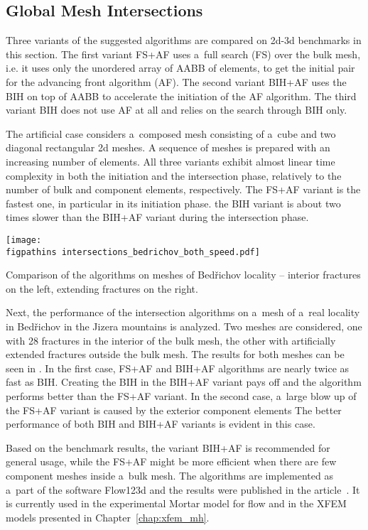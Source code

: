 \subsection{Global Mesh Intersections}
Three variants of the suggested algorithms are compared on 2d-3d benchmarks in this section.
The first variant FS+AF uses a~full search (FS) over the bulk mesh, i.e. it uses only the unordered array of AABB of elements,
to get the initial pair for the advancing front algorithm (AF).
The second variant BIH+AF uses the BIH on top of AABB to accelerate the initiation of the AF algorithm.
The third variant BIH does not use AF at all and relies on the search through BIH only. 

The artificial case considers a~composed mesh consisting of a~cube and two diagonal rectangular 2d meshes.
A sequence of meshes is prepared with an increasing number of elements.
All three variants exhibit almost linear time complexity in both the initiation and the intersection phase,
relatively to the number of bulk and component elements, respectively.
The FS+AF variant is the fastest one, in particular in its initiation phase.
the BIH variant is about two times slower than the BIH+AF variant during the intersection phase. 

\begin{graph}[!htb]
    \centering
    \texttt{[image: \\figpathins intersections\_bedrichov\_both\_speed.pdf]}
    \caption[Comparison of the algorithms on meshes of Bed{\v r}ichov locality.]
    {Comparison of the algorithms on meshes of Bed{\v r}ichov locality -- 
        interior fractures on the left,
        extending fractures on the right.}
    \label{graph:bedrichov_speed}
\end{graph}
%
Next, the performance of the intersection algorithms on a~mesh of a~real locality in Bed{\v r}ichov in the Jizera mountains
is analyzed. Two meshes are considered, one with 28 fractures in the interior of the bulk mesh, 
the other with artificially extended fractures outside the bulk mesh.
The results for both meshes can be seen in .
In the first case, FS+AF and BIH+AF algorithms are nearly twice as fast as BIH.
Creating the BIH in the BIH+AF variant pays off and the algorithm performs better than the FS+AF variant.
In the second case, a~large blow up of the FS+AF variant is caused by the exterior component elements
The better performance of both BIH and BIH+AF variants is evident in this case.


Based on the benchmark results, the variant BIH+AF is recommended for general usage,
while the FS+AF might be more efficient when there are few component meshes inside a~bulk mesh.
The algorithms are implemented as a~part of the software Flow123d and the results were published in the article~\cite{brezina_2017}.
It is currently used in the experimental Mortar model for flow and in the XFEM models presented in Chapter~\ref{chap:xfem_mh}.



